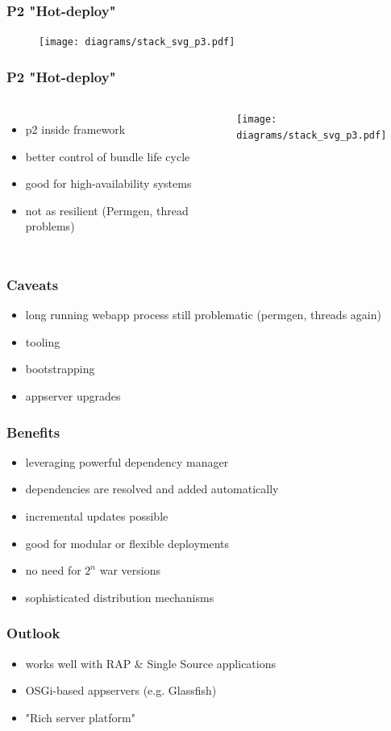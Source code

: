 \documentclass{beamer}
\begin{document}
\begin{frame}
  \frametitle{P2 "Hot-deploy"}
\begin{figure}
   \texttt{[image: diagrams/stack\_svg\_p3.pdf]}
\end{figure}
\end{frame}

\begin{frame}
  \frametitle{P2 "Hot-deploy"}
\begin{columns}
\column{2in}
  \begin{itemize}
  \item p2 inside framework\pause
  \item better control of bundle life cycle\pause
  \item good for high-availability systems\pause
  \item not as resilient (Permgen, thread problems)
  \end{itemize}      
\column{2.5in}
\texttt{[image: diagrams/stack\_svg\_p3.pdf]}
\end{columns}
\end{frame}


\begin{frame}
  \frametitle{Caveats}
  \begin{itemize}
  \item long running webapp process still problematic (permgen, threads again)\pause
  \item tooling \pause
  \item bootstrapping\pause
  \item appserver upgrades
  \end{itemize}   
\end{frame}

\begin{frame}
  \frametitle{Benefits}
  \begin{itemize}
  \item leveraging powerful dependency manager\pause
  \item dependencies are resolved and added automatically\pause
  \item incremental updates possible\pause
  \item good for modular or flexible deployments\pause
  \item no need for $2^n$ war versions\pause
  \item sophisticated distribution mechanisms
  \end{itemize}   
\end{frame}


 
\begin{frame}
  \frametitle{Outlook}
  \begin{itemize}
  \item works well with RAP \& Single Source applications\pause
  \item OSGi-based appservers (e.g. Glassfish)\pause
  \item "Rich server platform"
  \end{itemize}   
\end{frame}
\end{document}
